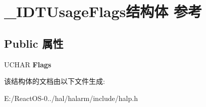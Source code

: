\hypertarget{struct___i_d_t_usage_flags}{}\section{\+\_\+\+I\+D\+T\+Usage\+Flags结构体 参考}
\label{struct___i_d_t_usage_flags}
\subsection*{Public 属性}
\begin{DoxyCompactItemize}
\item 
\mbox{\label{struct___i_d_t_usage_flags_aec1c95cd1cee799c11d23d24c12ec302}} 
U\+C\+H\+AR {\bfseries Flags}
\end{DoxyCompactItemize}


该结构体的文档由以下文件生成\+:\begin{DoxyCompactItemize}
\item 
E\+:/\+React\+O\+S-\/0../hal/halarm/include/halp.\+h\end{DoxyCompactItemize}
